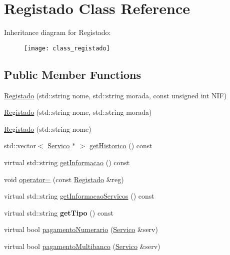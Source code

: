 \hypertarget{class_registado}{}\section{Registado Class Reference}
\label{class_registado}
Inheritance diagram for Registado\+:\begin{figure}[H]
\begin{center}
\leavevmode
\texttt{[image: class\_registado]}
\end{center}
\end{figure}
\subsection*{Public Member Functions}
\begin{DoxyCompactItemize}
\item 
\hyperlink{class_registado_ace8988ba72da772309e5aebf0bc82d4d}{Registado} (std\+::string nome, std\+::string morada, const unsigned int N\+IF)
\item 
\hyperlink{class_registado_a2ebad03ff43e207581c62952a88129b4}{Registado} (std\+::string nome, std\+::string morada)
\item 
\hyperlink{class_registado_a67a8d0c0dbd3103deae8813eb0958752}{Registado} (std\+::string nome)
\item 
std\+::vector$<$ \hyperlink{class_servico}{Servico} $\ast$ $>$ \hyperlink{class_registado_a304848f6ce1d82ad8438ec5e273cbc2d}{get\+Historico} () const
\item 
virtual std\+::string \hyperlink{class_registado_a7017f0d74afd44459c3d6affcb303d52}{get\+Informacao} () const
\item 
void \hyperlink{class_registado_a4570e0b507ef86f7fce56510f118a887}{operator=} (const \hyperlink{class_registado}{Registado} \&reg)
\item 
virtual std\+::string \hyperlink{class_registado_a15109adc7cd6a8834bd2ef909bcde008}{get\+Informacao\+Servicos} () const
\item 
\hypertarget{class_registado_a3512b905e10ee9a629c4dbbdc692f420}{}\label{class_registado_a3512b905e10ee9a629c4dbbdc692f420} 
virtual std\+::string {\bfseries get\+Tipo} () const
\item 
virtual bool \hyperlink{class_registado_af3c8f63f7df1cdfd27e44126f78b71d8}{pagamento\+Numerario} (\hyperlink{class_servico}{Servico} \&serv)
\item 
virtual bool \hyperlink{class_registado_a36be4ccf8e4b1bc26be7c1c2d4612229}{pagamento\+Multibanco} (\hyperlink{class_servico}{Servico} \&serv)

\end{DoxyCompactItemize}
